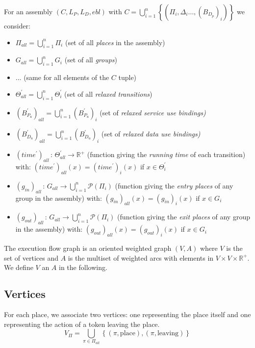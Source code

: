 For an assembly $\left(C,L_{P},L_{D},ebl\right)$ with $C=\bigcup_{i=1}^{n}\left\{ \left(\Pi_{i},\Delta_{i}\dots,\left(B_{D_{p}}\right)_{i}\right)\right\} $
we consider:
\begin{itemize}
\item $\Pi_{all}=\bigcup_{i=1}^{n}\Pi_{i}$ (set of all \emph{places} in
the assembly)
\item $G_{all}=\bigcup_{i=1}^{n}G_{i}$ (set of all \emph{groups})
\item ... (same for all elements of the $C$ tuple)
\item $\Theta_{all}^{\prime}=\bigcup_{i=1}^{n}\Theta_{i}^{\prime}$ (set
of all \emph{relaxed transitions})
\item $\left(B_{P_{u}}^{\prime}\right)_{all}=\bigcup_{i=1}^{n}\left(B_{P_{u}}^{\prime}\right)_{i}$
(set of\emph{ relaxed service use bindings)}
\item $\left(B_{D_{u}}^{\prime}\right)_{all}=\bigcup_{i=1}^{n}\left(B_{D_{u}}^{\prime}\right)_{i}$
(set of \emph{relaxed data use bindings)}
\item $\left(time^{\prime}\right)_{all}\,:\,\Theta_{all}^{\prime}\rightarrow\mathbb{R}^{+}$
(function giving the \emph{running time} of each transition) with:
$\left(time^{\prime}\right)_{all}\left(x\right)=\left(time^{\prime}\right)_{i}\left(x\right)$
if $x\in\Theta_{i}^{\prime}$ 
\item $\left(g_{in}\right)_{all}\,:\,G_{all}\rightarrow\bigcup_{i=1}^{n}\mathcal{P}\left(\Pi_{i}\right)$
(function giving the \emph{entry places} of any group in the assembly)
with: $\left(g_{in}\right)_{all}\left(x\right)=\left(g_{in}\right)_{i}\left(x\right)$
if $x\in G_{i}$ 
\item $\left(g_{out}\right)_{all}\,:\,G_{all}\rightarrow\bigcup_{i=1}^{n}\mathcal{P}\left(\Pi_{i}\right)$
(function giving the \emph{exit places }of any group in the assembly)
with: $\left(g_{out}\right)_{all}\left(x\right)=\left(g_{out}\right)_{i}\left(x\right)$
if $x\in G_{i}$ 
\end{itemize}
The execution flow graph is an oriented weighted graph \emph{$\left(V,A\right)$}
where $V$ is the set of vertices and $A$ is the multiset of weighted
arcs with elements in $V\times V\times\mathbb{R}^{+}$. We define
$V$ an $A$ in the following.

\subsection{Vertices}

For each place, we associate two vertices: one representing the place
itself and one representing the action of a token leaving the place.
\[
V_{\Pi}=\bigcup_{\pi\in\Pi_{all}}\left\{ \left(\pi,\text{place}\right),\left(\pi,\text{leaving}\right)\right\} 
\]

